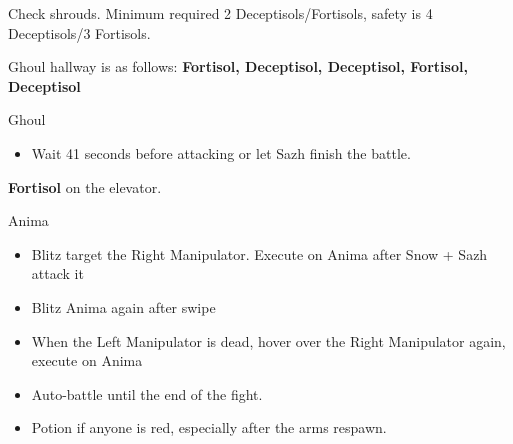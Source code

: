 \begin{paracol}{2}


	\switchcolumn
	Check shrouds. Minimum required 2 Deceptisols/Fortisols, safety is 4 Deceptisols/3 Fortisols.

	Ghoul hallway is as follows: {\bf Fortisol, Deceptisol, Deceptisol, Fortisol, Deceptisol}

	\begin{battle}{Ghoul}
		\begin{itemize}
			\item Wait 41 seconds before attacking or let Sazh finish the battle.
		\end{itemize}
	\end{battle}

	\textbf{Fortisol} on the elevator.

	\begin{battle}{Anima}
		\begin{itemize}
			\item Blitz target the Right Manipulator. Execute on Anima after Snow + Sazh attack it
			\item Blitz Anima again after swipe
			\item When the Left Manipulator is dead, hover over the Right Manipulator again, execute on Anima
			\item Auto-battle until the end of the fight.
			\item Potion if anyone is red, especially after the arms respawn.
		\end{itemize}
	\end{battle}



\end{paracol}


